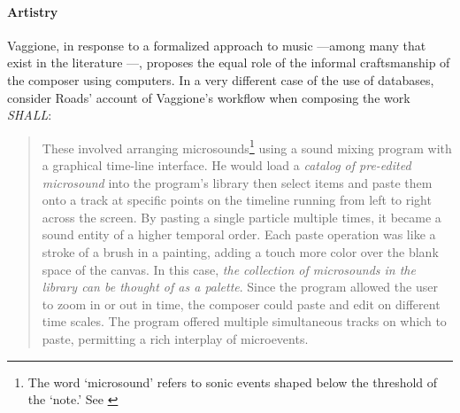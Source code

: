 




\paragraph{Artistry}
Vaggione, in response to a formalized approach to music ---among many that exist in the literature \parencite{Hil59:Exp, Xen92:For, Tru76:ACo, Ari05:Ano}---, proposes the equal role of the informal craftsmanship of the composer using computers. In a very different case of the use of databases, consider Roads' account of Vaggione's workflow when composing the work \textit{SHALL}:

\begin{quote}
	These involved arranging microsounds\footnote{The word `microsound' refers to sonic events shaped below the threshold of the `note.' See \parencite{Roa04:Mic}} using a sound mixing program with a graphical time-line interface. He would load a \textit{catalog of pre-edited microsound} into the program's library then select items and paste them onto a track at specific points on the timeline running from left to right across the screen. By pasting a single particle multiple times, it became a sound entity of a higher temporal order. Each paste operation was like a stroke of a brush in a painting, adding a touch more color over the blank space of the canvas. In this case, \textit{the collection of microsounds in the library can be thought of as a palette}. Since the program allowed the user to zoom in or out in time, the composer could paste and edit on different time scales. The program offered multiple simultaneous tracks on which to paste, permitting a rich interplay of microevents. \im \parencite[313-314]{Roa04:Mic}
\end{quote}

